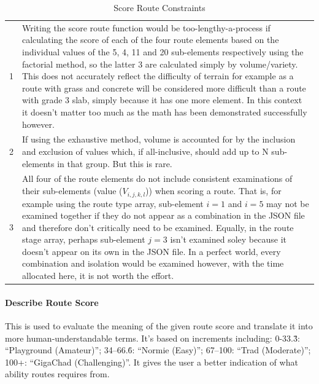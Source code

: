 \documentclass[11pt, english]{article}
\begin{document}
	\begin{table}[h]
		\scriptsize
		\renewcommand{\arraystretch}{1.25}
	\begin{center}
	\begin{tabular}{l|p{12cm}}
		\hline
		\hline
		1 & Writing the score route function would be too-lengthy-a-process if calculating the score of each of the four route elements based on the individual values of the 5, 4, 11 and 20 sub-elements respectively using the factorial method, so the latter 3 are calculated simply by volume/variety. This does not accurately reflect the difficulty of terrain for example as a route with grass and concrete will be considered more difficult than a route with grade 3 slab, simply because it has one more element. In this context it doesn't matter too much as the math has been demonstrated successfully however.\\
		2 & If using the exhaustive method, volume is accounted for by the inclusion and exclusion of values which, if all-inclusive, should add up to N sub-elements in that group. But this is rare.\\
		3 & All four of the route elements do not include consistent examinations of their sub-elements (value ($V_{i,j,k,l}$)) when scoring a route. That is, for example using the route type array, sub-element $i=1$ and $i=5$ may not be examined together if they do not appear as a combination in the JSON file and therefore don't critically need to be examined. Equally, in the route stage array, perhaps sub-element $j=3$ isn't examined soley because it doesn't appear on its own in the JSON file. In a perfect world, every combination and isolation would be examined however, with the time allocated here, it is not worth the effort.\\
		\hline
		\hline
	\end{tabular}
		\caption{Score Route Constraints}
	\end{center}
	\end{table}

			\paragraph{Describe Route Score}

	This is used to evaluate the meaning of the given route score and translate it into more human-understandable terms. It's based on increments including: 0-33.\.{3}: ``Playground (Amateur)''; 34--66.\.{6}: ``Normie (Easy)''; 67--100: ``Trad (Moderate)''; 100+: ``GigaChad (Challenging)''. It gives the user a better indication of what ability routes requires from.
\end{document}
